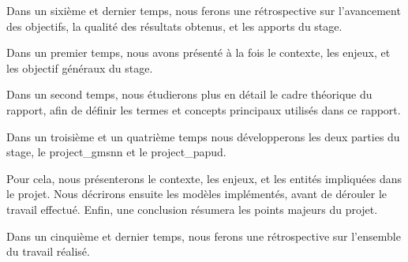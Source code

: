 Dans un sixième et dernier temps, nous ferons une rétrospective sur l'avancement des objectifs, la qualité des résultats obtenus, et les apports du stage.



Dans un premier temps, nous avons présenté à la fois le contexte, les enjeux, et les objectif généraux du stage.

Dans un second temps, nous étudierons plus en détail le cadre théorique du rapport, afin de définir les termes et concepts principaux utilisés dans ce rapport.

Dans un troisième et un quatrième temps nous développerons les deux parties du stage, le \gls{project_gmsnn} et le \gls{project_papud}.

Pour cela, nous présenterons le contexte, les enjeux, et les entités impliquées dans le projet. Nous décrirons ensuite les modèles implémentés, avant de dérouler le travail effectué. Enfin, une conclusion résumera les points majeurs du projet.

Dans un cinquième et dernier temps, nous ferons une rétrospective sur l'ensemble du travail réalisé.




